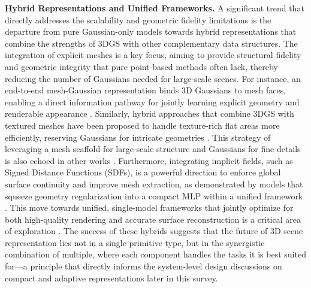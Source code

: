 \documentclass[11pt]{article}
\begin{document}
\textbf{Hybrid Representations and Unified Frameworks.} A significant trend that directly addresses the scalability and geometric fidelity limitations is the departure from pure Gaussian-only models towards hybrid representations that combine the strengths of 3DGS with other complementary data structures. The integration of explicit meshes is a key focus, aiming to provide structural fidelity and geometric integrity that pure point-based methods often lack, thereby reducing the number of Gaussians needed for large-scale scenes. For instance, an end-to-end mesh-Gaussian representation binds 3D Gaussians to mesh faces, enabling a direct information pathway for jointly learning explicit geometry and renderable appearance \cite{ref90}. Similarly, hybrid approaches that combine 3DGS with textured meshes have been proposed to handle texture-rich flat areas more efficiently, reserving Gaussians for intricate geometries \cite{ref47}. This strategy of leveraging a mesh scaffold for large-scale structure and Gaussians for fine details is also echoed in other works \cite{ref93,ref226}. Furthermore, integrating implicit fields, such as Signed Distance Functions (SDFs), is a powerful direction to enforce global surface continuity and improve mesh extraction, as demonstrated by models that squeeze geometry regularization into a compact MLP within a unified framework \cite{ref209}. This move towards unified, single-model frameworks that jointly optimize for both high-quality rendering and accurate surface reconstruction is a critical area of exploration \cite{ref209}. The success of these hybrids suggests that the future of 3D scene representation lies not in a single primitive type, but in the synergistic combination of multiple, where each component handles the tasks it is best suited for---a principle that directly informs the system-level design discussions on compact and adaptive representations later in this survey.
\end{document}
